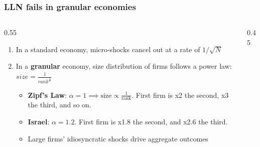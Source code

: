\documentclass[aspectratio=169,11pt]{beamer}
\begin{document}
\begin{frame} \label{src_sqrtn}
    \frametitle{LLN fails in granular economies}
    \begin{columns}[T]
        \begin{column}{0.55\textwidth}


            \vspace{0.8cm}
            \begin{enumerate}
                \item {In a standard economy, micro-shocks cancel out at a rate of $1/\sqrt{N}$ \hyperlink{app_sqrtn}{}
                      \vspace{0.4cm}}
                \item {In a \textbf{granular} economy, size distribution of firms follows a power law: $size=\frac{1}{rank^{\frac{1}{\alpha}}}$
                      \begin{itemize}
                          \item \textbf{Zipf's Law}: $\alpha=1 \implies \text{size} \propto \frac{1}{\text{rank}}$. First firm is x2 the second, x3 the third, and so on.
                          \item \textbf{Israel}: $\alpha=1.2$. First firm is x1.8 the second, and x2.6 the third.
                          \item Large firms' idiosyncratic shocks drive aggregate outcomes
                      \end{itemize}}
            \end{enumerate}
        \end{column}


        \begin{column}{0.45\textwidth}
        \end{column}
    \end{columns}

\end{frame}
\end{document}
